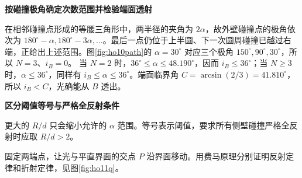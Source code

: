 \begin{solution}
\par\medskip{}\noindent\textbf{按碰撞极角确定次数范围并检验端面透射}\par\nobreak
在相邻碰撞点形成的等腰三角形中，两半径的夹角为 $2\alpha$，故外壁碰撞点的极角依次为 $180^\circ-\alpha,180^\circ-3\alpha,\ldots$。最后一点仍位于上半圆、下一次圆周碰撞已越过右端，正给出上述范围。图\ref{fig:ho10path}的 $\alpha=30^\circ$ 对应三个极角 $150^\circ,90^\circ,30^\circ$，所以 $N=3$、$i_B=0$。
当 $N=2$ 时，$36^\circ\le\alpha\le48.190^\circ$，因而 $i_B\le36^\circ$；当 $N\ge3$ 时，$\alpha\le36^\circ$，同样有 $i_B\le\alpha\le36^\circ$。端面临界角 $C=\arcsin(2/3)=41.810^\circ$，所以 $i_B<C$，光确能从 $B$ 透出。



\par\medskip{}\noindent\textbf{区分阈值等号与严格全反射条件}\par\nobreak
更大的 $R/d$ 只会缩小允许的 $\alpha$ 范围。等号表示阈值，要求所有侧壁碰撞严格全反射时应取 $R/d>2$。
\end{solution}

\begin{question}
\begin{example}[由费马原理导出反射与折射定律]\label{ex:ho11}
固定两端点，让光与平直界面的交点 $P$ 沿界面移动。用费马原理分别证明反射定律和折射定律，见图\ref{fig:ho11q}。
\end{example}
\end{question}

